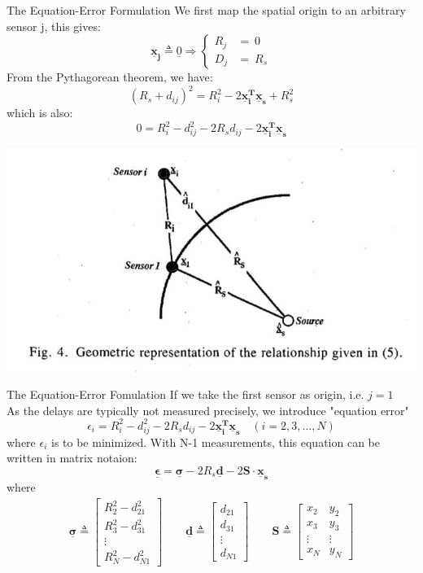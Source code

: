 \documentclass[10pt]{beamer}
\begin{document}
\begin{frame}{The Equation-Error Formulation}
  We first map the spatial origin to an arbitrary sensor j, this gives:
  $$ \mathbf{\underline{x}_{j}}\triangleq \underline{0}\Longrightarrow \begin{cases} R_{j} &= \ 0 \\ D_{j} &= \ R_{s} \end{cases}$$
  From the Pythagorean theorem, we have:
  $$(R_{s}+d_{ij})^2 = R_{i}^2 - 2\mathbf{\underline{x}_{i}^T \underline{x}_{s}} + R_{s}^2 $$
  which is also:
  $$ 0 = R_{i}^2 - d_{ij}^2 -2R_{s}d_{ij} - 2\mathbf{\underline{x}_{i}^T \underline{x}_{s}} $$
  \begin{center}
  \includegraphics[scale=0.7]{Pythagorean.JPG}
  \end{center}
\end{frame}
\begin{frame}{The Equation-Error Fomulation}
  If we take the first sensor as origin, i.e. $j=1$ \\
  As the delays are typically not measured precisely, we introduce "equation error"
  $$ \epsilon_{i} = R_{i}^2 - d_{ij}^2 -2R_{s}d_{ij} - 2\mathbf{\underline{x}_{i}^T \underline{x}_{s}} \quad (i=2,3,\ldots,N) $$
  where $\epsilon_{i}$ is to be minimized.
  With N-1 measurements, this equation can be written in matrix notaion:
  $$ \boldsymbol{\underline{\epsilon}} = \boldsymbol{\underline{\sigma}} - 2R_{s}\mathbf{\underline{d}} - 2 \mathbf{ S \cdot \underline{x}_{s}} $$
  where
  \begin{align*}
    \boldsymbol{\underline{\sigma}} \triangleq \begin{bmatrix} R_{2}^2 - d_{21}^2 \\ R_{3}^2 - d_{31}^2 \\ \vdots \\ R_{N}^2 - d_{N1}^2 \end{bmatrix} \qquad
    \mathbf{\underline{d}}      \triangleq \begin{bmatrix} d_{21}\\ d_{31} \\ \vdots \\ d_{N1} \end{bmatrix} \qquad
    \mathbf{S} \triangleq \begin{bmatrix} x_2 & y_2 \\x_3 & y_3\\ \vdots & \vdots \\ x_N & y_N \end{bmatrix}
  \end{align*}
\end{frame}
\end{document}
